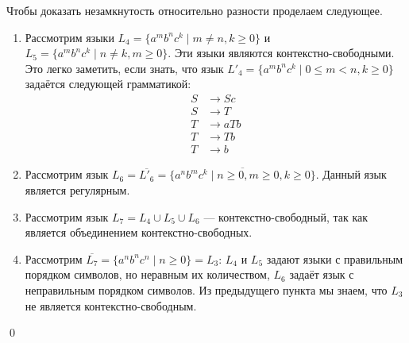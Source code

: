 Чтобы доказать незамкнутость относительно разности проделаем следующее.
\begin{enumerate}
\item Рассмотрим языки $L_4 = \{a^m b^n c^k \mid m \neq n, k \geq 0\}$ и $L_5 = \{a^m b^n c^k \mid n \neq k, m \geq 0\}$.
Эти языки являются контекстно-свободными.
Это легко заметить, если знать, что язык $L'_4 = \{a^m b^n c^k
\mid 0 \leq m < n, k \geq 0\}$ задаётся следующей грамматикой:
  \begin{align*}
    S & \to S c \\
    S & \to T \\
    T & \to a T b \\
    T & \to T b \\
    T & \to b
  \end{align*}

\item Рассмотрим язык $L_6 = \overline{L'_6} = \overline{\{a^n b^m c^k \mid n \geq 0, m \geq 0, k \geq 0\}}$. Данный язык является регулярным.

\item Рассмотрим язык $L_7 = L_4 \cup L_5 \cup L_6$ --- контекстно-свободный, так как является объединением контекстно-свободных.

\item Рассмотрим $\overline{L_7} = \{a^n b^n c^n \mid n \geq 0\} = L_3$: $L_4$ и $L_5$ задают языки с правильным порядком символов, но неравным их количеством, $L_6$ задаёт язык с неправильным порядком символов.
Из предыдущего пункта мы знаем, что $L_3$  не является контекстно-свободным.

\end{enumerate}

\qed

